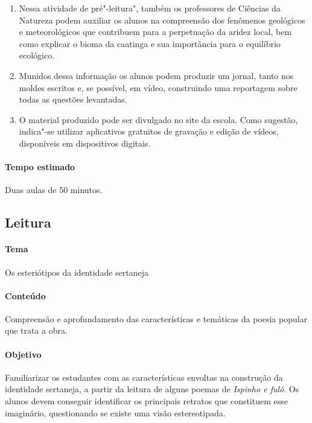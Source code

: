 \documentclass[12pt]{extarticle}
\begin{document}
{\begin{enumerate}
Sugerimos abordar a questão da transposição do rio São Francisco como 
solução para a seca em lugares mais áridos. O que os alunos pensam a 
respeito dessa iniciativa? 

\item
Nessa atividade de pré"-leitura", também os professores de Ciências da 
Natureza podem auxiliar os alunos na compreensão dos fenômenos geológicos 
e meteorológicos que contribuem para a perpetuação da aridez local, bem 
como explicar o bioma da caatinga e sua importância para o equilíbrio 
ecológico. 

\item
Munidos dessa informação os alunos podem produzir um jornal, tanto nos 
moldes escritos e, se possível, em vídeo, construindo uma reportagem 
sobre todas as questões levantadas. 

\item
O material produzido pode ser divulgado no site da
escola. Como sugestão, indica"-se utilizar aplicativos gratuitos de
gravação e edição de vídeos, disponíveis em dispositivos digitais.

\end{enumerate}

\paragraph{Tempo estimado} Duas aulas de 50 minutos. 


\subsection{Leitura}

\paragraph{Tema} Os esteriótipos da identidade sertaneja 


\paragraph{Conteúdo} Compreensão e aprofundamento das características e 
temáticas da poesia popular que trata a obra.

\paragraph{Objetivo} Familiarizar os estudantes com as características 
envoltas na construção da identidade sertaneja, a partir da leitura de 
alguns poemas de \emph{Ispinho e fulô}.
Os alunos devem conseguir identificar os principais retratos que 
constituem esse imaginário, questionando se existe uma visão estereotipada. 


}
\end{document}
